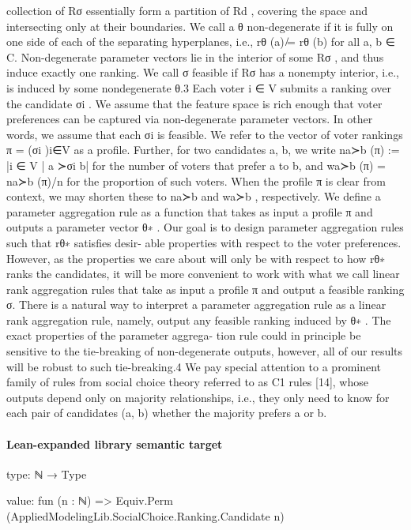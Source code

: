 \documentclass[10pt]{article}
\begin{document}
\begin{ReviewVerbatim}
collection of {Rσ } essentially form a partition of Rd , covering the space and intersecting only at
their boundaries.
We call a θ non-degenerate if it is fully on one side of each of the separating hyperplanes, i.e.,
rθ (a) ̸= rθ (b) for all a, b ∈ C. Non-degenerate parameter vectors lie in the interior of some Rσ ,
and thus induce exactly one ranking. We call σ feasible if Rσ has a nonempty interior, i.e., is induced
by some nondegenerate θ.3
Each voter i ∈ V submits a ranking over the candidate σi . We assume that the feature space is
rich enough that voter preferences can be captured via non-degenerate parameter vectors. In other
words, we assume that each σi is feasible. We refer to the vector of voter rankings π = (σi )i∈V as
a profile. Further, for two candidates a, b, we write na≻b (π) := |{i ∈ V | a ≻σi b}| for the number
of voters that prefer a to b, and wa≻b (π) = na≻b (π)/n for the proportion of such voters. When the
profile π is clear from context, we may shorten these to na≻b and wa≻b , respectively.
We define a parameter aggregation rule as a function that takes as input a profile π and outputs a
parameter vector θ∗ . Our goal is to design parameter aggregation rules such that rθ∗ satisfies desir-
able properties with respect to the voter preferences. However, as the properties we care about will
only be with respect to how rθ∗ ranks the candidates, it will be more convenient to work with what
we call linear rank aggregation rules that take as input a profile π and output a feasible ranking σ.
There is a natural way to interpret a parameter aggregation rule as a linear rank aggregation rule,
namely, output any feasible ranking induced by θ∗ . The exact properties of the parameter aggrega-
tion rule could in principle be sensitive to the tie-breaking of non-degenerate outputs, however, all
of our results will be robust to such tie-breaking.4
We pay special attention to a prominent family of rules from social choice theory referred to as C1
rules [14], whose outputs depend only on majority relationships, i.e., they only need to know for
each pair of candidates (a, b) whether the majority prefers a or b.
\end{ReviewVerbatim}



\paragraph{Lean-expanded library semantic target}
\begin{ReviewVerbatim}
type:
ℕ → Type

value:
fun (n : ℕ) => Equiv.Perm (AppliedModelingLib.SocialChoice.Ranking.Candidate n)
\end{ReviewVerbatim}
\end{document}
